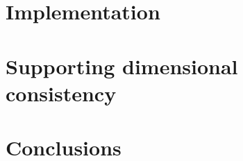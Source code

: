 \documentclass{ws-procs9x6}
\begin{document}
\section{Implementation}




\section{Supporting dimensional consistency}
\label{sec:example-revisited}


\section{Conclusions}





\end{document}
